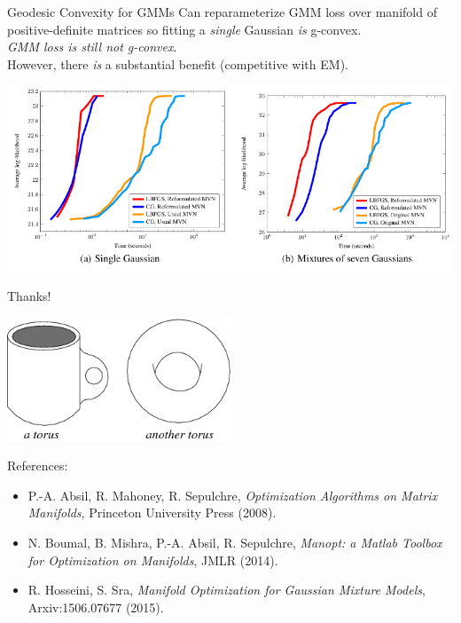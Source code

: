 \documentclass[xcolor=dvipsnames,t]{beamer} %
\begin{document}
\begin{frame}{Geodesic Convexity for GMMs}
   Can reparameterize GMM loss over manifold of positive-definite matrices so fitting a \emph{single} Gaussian \emph{is} g-convex.\\
   \emph{GMM loss is still not g-convex}.\\
   However, there \emph{is} a substantial benefit (competitive with EM).

   \begin{center}
      \includegraphics[width=1\textwidth]{figures/gmm_loss.pdf}
   \end{center}
\end{frame}



\begin{frame}{Thanks!}
   
   \begin{center}
      \includegraphics[width=0.5\textwidth]{figures/torus.png}
   \end{center}
   
   References:
   \begin{itemize}
      \item P.-A. Absil, R. Mahoney, R. Sepulchre, \emph{Optimization Algorithms on Matrix Manifolds}, Princeton University Press (2008).
      \item N. Boumal, B. Mishra, P.-A. Absil, R. Sepulchre, \emph{Manopt: a Matlab Toolbox for Optimization on Manifolds}, JMLR (2014).
      \item R. Hosseini, S. Sra, \emph{Manifold Optimization for Gaussian Mixture Models}, Arxiv:1506.07677 (2015).
   \end{itemize}
\end{frame}
\end{document}
